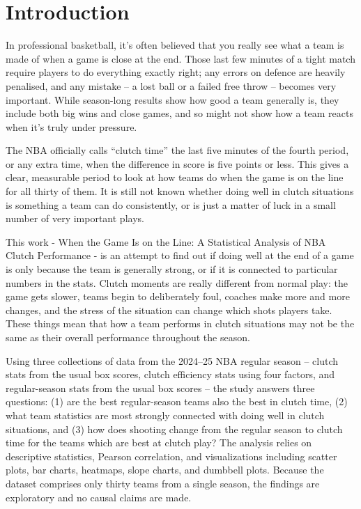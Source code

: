 \section{Introduction}

In professional basketball, it’s often believed that you really see what a team is made of when a game is close at the 
end. Those last few minutes of a tight match require players to do everything exactly right; any errors on defence are 
heavily penalised, and any mistake – a lost ball or a failed free throw – becomes very important. While season-long 
results show how good a team generally is, they include both big wins and close games, and so might not show how a team 
reacts when it’s truly under pressure. 

The NBA officially calls “clutch time” the last five minutes of the fourth period, or any extra time, when the 
difference in score is five points or less.  This gives a clear, measurable period to look at how teams do when 
the game is on the line for all thirty of them. It is still not known whether doing well in clutch situations is 
something a team can do consistently, or is just a matter of luck in a small number of very important plays.

This work - When the Game Is on the Line: A Statistical Analysis of NBA Clutch Performance - is an attempt to 
find out if doing well at the end of a game is only because the team is generally strong, or if it is connected 
to particular numbers in the stats. Clutch moments are really different from normal play: the game gets slower, 
teams begin to deliberately foul, coaches make more and more changes, and the stress of the situation can change 
which shots players take. These things mean that how a team performs in clutch situations may not be the same as 
their overall performance throughout the season.

Using three collections of data from the 2024–25 NBA regular season – clutch stats from the usual box scores, 
clutch efficiency stats using four factors, and regular-season stats from the usual box scores – the study answers 
three questions: (1) are the best regular-season teams also the best in clutch time, (2) what team statistics are most 
strongly connected with doing well in clutch situations, and (3) how does shooting change from the regular season to 
clutch time for the teams which are best at clutch play?
The analysis relies on descriptive statistics, Pearson correlation, and visualizations including
scatter plots, bar charts, heatmaps, slope charts, and dumbbell plots. Because the dataset
comprises only thirty teams from a single season, the findings are exploratory and no causal
claims are made.